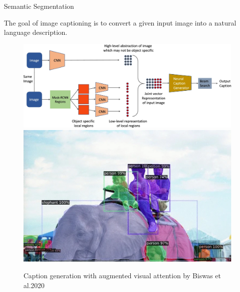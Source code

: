 \begin{vbframe}{Semantic Segmentation}

The goal of image captioning is to convert a given input image into a natural language description.

\begin{figure}
\centering
\begin{minipage}{.65\textwidth}
  \centering
  \includegraphics[width=.9\linewidth]{figure/caption_generation.png}
\end{minipage}%
\begin{minipage}{.35\textwidth}
  \centering
  \includegraphics[width=.9\linewidth]{figure/example_sample_generation.png}
\end{minipage}
\caption\tiny{Caption generation with augmented visual attention by Biswas et al.2020}
\end{figure}

\end{vbframe}


\endlecture
